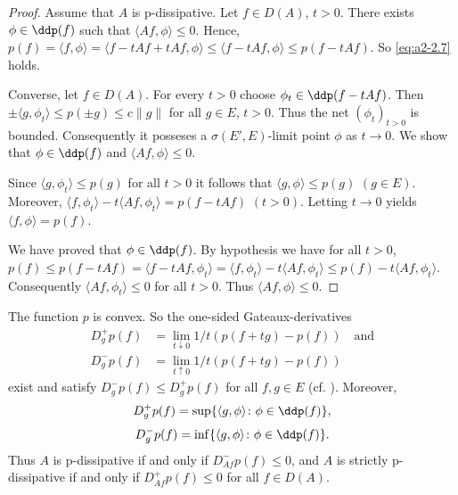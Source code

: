 \begin{proof}
Assume that $A$ is p-dissipative.
Let $f \in D(A)$, $t > 0$.
There exists $\phi \in\ddp(f)$ such that $\langle Af,\phi \rangle \leq 0$.
Hence, $p(f) = \langle f,\phi \rangle = \langle f - tAf + tAf, \phi \rangle \leq \langle f - tAf,\phi \rangle \leq p(f - tAf)$.
So \eqref{eq:a2-2.7} holds.

Converse, let $f \in D(A)$.
For every $t > 0$ choose $\phi_{t} \in \ddp(f - tAf)$.
Then $\pm\langle g,\phi_{t} \rangle \leq p(\pm g) \leq c\|g\|$ for all $g \in E$, $t > 0$.
Thus the net $(\phi_{t})_{t>0}$ is bounded.
Consequently it posseses a $\sigma(E',E)$-limit point $\phi$ as $t \to 0$.
We show that $\phi \in \ddp(f)$ and $\langle Af,\phi \rangle \leq 0$.

Since $\langle g,\phi_{t} \rangle \leq p(g)$ for all $t > 0$ it follows that $\langle g,\phi \rangle \leq p(g)$ $(g \in E)$.
Moreover, $\langle f,\phi_{t} \rangle - t\langle Af, \phi_{t} \rangle = p(f - tAf)$ $(t > 0)$.
Letting $t \to 0$ yields $\langle f,\phi \rangle = p(f)$.

We have proved that $\phi \in \ddp(f)$.
By hypothesis we have for all $t > 0$, 
$p(f) \leq p(f-tAf) 
= \langle f-tAf,\phi_{t} \rangle 
= \langle f,\phi_{t} \rangle - t\langle Af,\phi_{t} \rangle \leq p(f) - t\langle Af,\phi_{t} \rangle$.
Consequently $\langle Af,\phi_{t} \rangle \leq 0$ for all $t > 0$.
Thus $\langle Af,\phi \rangle \leq 0$.
\end{proof}
\begin{remark}\label{rem:a2-2.4}
The function $p$ is convex.
So the one-sided Gateaux-derivatives
\begin{align*}
D^{+}_{g} p(f) &= \lim_{t \downarrow 0} 1/t (p(f+tg) - p(f)) \quad \text{and} \\
D^{-}_{g} p(f) &= \lim_{t \uparrow 0} 1/t (p(f+tg) - p(f))
\end{align*}
exist and satisfy $D^{-}_{g}p(f) \leq D^{+}_{g}p(f)$ for all $f, g \in E$ (cf. \citet{moreau:1966}).
Moreover,
\begin{equation}\label{eq:a2-2.9}
D^{+}_{g} p(f) = \sup \{\langle g,\phi \rangle \colon \phi \in \ddp(f)\},
\end{equation}
\begin{equation}\label{eq:a2-2.10}
D^{-}_{g} p(f) = \inf \{\langle g,\phi \rangle \colon \phi \in \ddp(f)\}.
\end{equation}
Thus $A$ is p-dissipative if and only if $D^{-}_{Af} p(f) \leq 0$, and $A$ is strictly p-dissipative if and only if $D^{+}_{Af} p(f) \leq 0$ for all $f \in D(A)$.
\end{remark}
